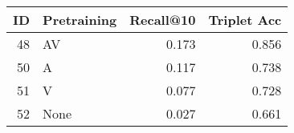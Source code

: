 \begin{tabular}{rlrr}
\toprule
 ID & Pretraining &  Recall@10 &  Triplet Acc \\
\midrule
 48 &          AV &      0.173 &        0.856 \\
 50 &           A &      0.117 &        0.738 \\
 51 &           V &      0.077 &        0.728 \\
 52 &        None &      0.027 &        0.661 \\
\bottomrule
\end{tabular}
